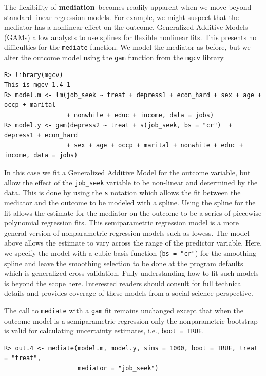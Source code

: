 \documentclass[11pt,letterpaper]{article}
\theoremstyle{plain}
\newcommand\bmediation{{\bf mediation}}
\begin{document}
The flexibility of \bmediation\ becomes readily apparent when we move
beyond standard linear regression models.  For example, we might
suspect that the mediator has a nonlinear effect on the outcome.
Generalized Additive Models (GAMs) allow analysts to use splines for
flexible nonlinear fits.  This presents no difficulties for the
\texttt{mediate} function.  We model the mediator as before, but we
alter the outcome model using the \texttt{gam} function from the
\texttt{mgcv} library.
\begin{verbatim}
R> library(mgcv)
This is mgcv 1.4-1
R> model.m <- lm(job_seek ~ treat + depress1 + econ_hard + sex + age + occp + marital
                 + nonwhite + educ + income, data = jobs)
R> model.y <- gam(depress2 ~ treat + s(job_seek, bs = "cr")  + depress1 + econ_hard
                 + sex + age + occp + marital + nonwhite + educ + income, data = jobs)
\end{verbatim}
In this case we fit a Generalized Additive Model for the outcome
variable, but allow the effect of the \texttt{job\_seek} variable to
be non-linear and determined by the data. This is done by using the
\texttt{s} notation which allows the fit between the mediator and
the outcome to be modeled with a spline.  Using the spline for the fit
allows the estimate for the mediator on the outcome to be a series of
piecewise polynomial regression fits. This semiparametric regression
model is a more general version of nonparametric regression models
such as lowess. The model above allows the estimate to vary across the
range of the predictor variable. Here, we specify the model with a
cubic basis function (\texttt{bs = "cr"}) for the smoothing spline and
leave the smoothing selection to be done at the program defaults which
is generalized cross-validation.  Fully understanding how to fit such
models is beyond the scope here.  Interested readers should consult
\cite{Wood:2006} for full technical details and \cite{Keele:2008}
provides coverage of these models from a social science perspective.

The call to \texttt{mediate} with a \texttt{gam} fit remains
unchanged except that when the outcome model is a semiparametric
regression only the nonparametric bootstrap is valid for calculating
uncertainty estimates, i.e., {\tt boot = TRUE}.
\begin{verbatim}
R> out.4 <- mediate(model.m, model.y, sims = 1000, boot = TRUE, treat = "treat",
                    mediator = "job_seek")
\end{verbatim}
\end{document}

